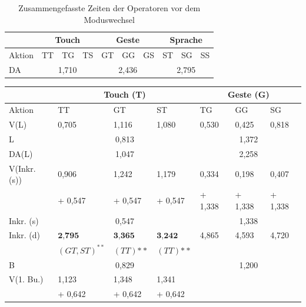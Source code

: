 \begin{table}[ht]
  \centering
	\begin{tabular}{|l|l|l|l|l|l|l|l|l|l|}
		\hline
		& \multicolumn{3}{|c|}{Touch} & \multicolumn{3}{|c|}{Geste}&\multicolumn{3}{|c|}{Sprache}\\
		\hline
		Aktion 					& TT 		& TG 		& TS 		& GT 		& GG 		& GS 		& ST 		& SG 		& SS\\
		\hline
		DA 	& \multicolumn{3}{|c|}{1,710} &	\multicolumn{3}{|c|}{2,436} 	&	\multicolumn{3}{|c|}{2,795} \\
		\hline			
  \end{tabular}
	\caption{Zusammengefasste Zeiten der Operatoren vor dem Moduswechsel}
\label{tab:OperatorzeitenZusammengefasst1}
\end{table}
\begin{table}[ht]
  \centering
	\begin{tabular}{|l|l|l|l|l|l|l|}
		\hline
		& \multicolumn{3}{|c|}{Touch (T)} & \multicolumn{3}{|c|}{Geste (G)}\\
		\hline
		Aktion 					& TT 	& GT 	& ST 	& TG 	& GG 	& SG \\
		\hline
		V(L)	& {0,705} 	& {1,116}		& {1,080} 	&	{0,530}		&	{0,425}		&	{0,818}\\
		\hline
		L					& \multicolumn{3}{|c|}{0,813} &	\multicolumn{3}{|c|}{1,372}\\
		\hline
		DA(L)			& \multicolumn{3}{|c|}{1,047} &	\multicolumn{3}{|c|}{2,258}\\
		\hline
		V(Inkr. (s))
										& {0,906} 	& {1,242}		& {1,179} 	&	{0,334}		&	{0,198}		&	{0,407}\\
										& \small{+ 0,547} 	& \small{+ 0,547}	& \tiny{+ 0,547} 	&	\small{+ 1,338}	&	\tiny{+ 1,338}	&	\small{+ 1,338}\\
		\hline
		Inkr. (s)				& \multicolumn{3}{|c|}{0,547} &	\multicolumn{3}{|c|}{1,338}\\
		\hline
		Inkr. (d)				& $\textbf{2,795}$ & $\textbf{3,365}$	& $\textbf{3,242}$ &	4,865	&	4,593	&	4,720	\\		
									& \small{$(GT,ST)^{**}$} & \small{$(TT){**}$}	& \small{$(TT){**}$}  &	&	&		 \\	
		\hline		
		B 				& \multicolumn{3}{|c|}{0,829} &	\multicolumn{3}{|c|}{1,200}\\			
		\hline
		V(1. Bu.)
										& {1,123} 	& {1,348}		& {1,341} 	&				& 			&  	\\
										& \small{+ 0,642} & \small{+ 0,642}	& \small{+ 0,642} &				& 			&  		\\

\end{tabular}
\end{table}
